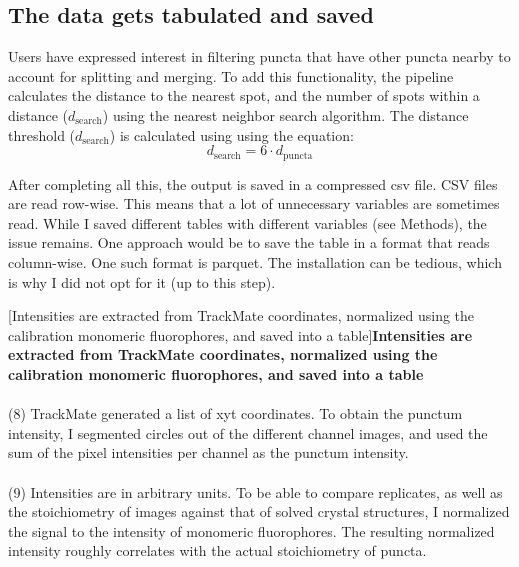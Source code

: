 \subsection{The data gets tabulated and saved}
Users have expressed interest in filtering puncta that have other puncta nearby to account for splitting and merging. To add this functionality, the pipeline calculates the distance to the nearest spot, and the number of spots within a distance ($d_\text{search}$) using the nearest neighbor search algorithm. The distance threshold ($d_\text{search}$) is calculated using using the equation:
\begin{equation}
d_\text{search} = 6\cdot d_\text{puncta}
\end{equation}

After completing all this, the output is saved in a compressed csv file. CSV files are read row-wise. This means that a lot of unnecessary variables are sometimes read. While I saved different tables with different variables (see Methods), the issue remains. One approach would be to save the table in a format that reads column-wise. One such format is parquet. The installation can be tedious, which is why I did not opt for it (up to this step).

\begin{centering}
[Intensities are extracted from TrackMate coordinates, normalized using the calibration monomeric fluorophores, and saved into a table]{\textbf{Intensities are extracted from TrackMate coordinates, normalized using the calibration monomeric fluorophores, and saved into a table}
\\
\\
(8) TrackMate generated a list of xyt coordinates. To obtain the punctum intensity, I segmented circles out of the different channel images, and used the sum of the pixel intensities per channel as the punctum intensity.
\\
\\
(9) Intensities are in arbitrary units. To be able to compare replicates, as well as the stoichiometry of images against that of solved crystal structures, I normalized the signal to the intensity of monomeric fluorophores. The resulting normalized intensity roughly correlates with the actual stoichiometry of puncta.}
\label{m:5}
\end{centering}

